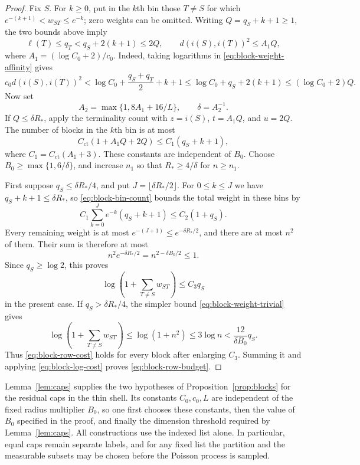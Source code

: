 \begin{proof}
Fix $S$.  For $k\ge0$, put in the $k$th bin those $T\ne S$ for which
$e^{-(k+1)}<w_{ST}\le e^{-k}$; zero weights can be omitted.
Writing $Q=q_S+k+1\ge1$, the two bounds above imply
\begin{equation}\label{eq:block-bin-parameters}
 \ell(T)\le q_T<q_S+2(k+1)\le2Q,
 \qquad
 d(i(S),i(T))^2\le A_1Q,
\end{equation}
where $A_1=(\log C_0+2)/c_0$.
Indeed, taking logarithms in \eqref{eq:block-weight-affinity} gives
\[
 c_0d(i(S),i(T))^2
 <\log C_0+\frac{q_S+q_T}{2}+k+1
 \le\log C_0+q_S+2(k+1)
 \le(\log C_0+2)Q.
\]
Now set
\[
 A_2=\max\{1,8A_1+16/L\},\qquad \delta=A_2^{-1}.
\]
If $Q\le\delta R_*$, apply the terminality count with
$z=i(S)$, $t=A_1Q$, and $u=2Q$.
The number of blocks in the $k$th bin is at most
\begin{equation}\label{eq:block-bin-count}
 C_{\mathrm{ct}}(1+A_1Q+2Q)\le C_1(q_S+k+1),
\end{equation}
where $C_1=C_{\mathrm{ct}}(A_1+3)$.
These constants are independent of $B_0$.
Choose $B_0\ge\max\{1,6/\delta\}$, and increase $n_1$ so that
$R_*\ge4/\delta$ for $n\ge n_1$.

First suppose $q_S\le\delta R_*/4$, and put
$J=\lfloor\delta R_*/2\rfloor$.
For $0\le k\le J$ we have
$q_S+k+1\le\delta R_*$, so \eqref{eq:block-bin-count} bounds the
total weight in these bins by
\[
 C_1\sum_{k=0}^J e^{-k}(q_S+k+1)\le C_2(1+q_S).
\]
Every remaining weight is at most
$e^{-(J+1)}\le e^{-\delta R_*/2}$, and there are at most $n^2$ of them.
Their sum is therefore at most
\[
 n^2e^{-\delta R_*/2}=n^{2-\delta B_0/2}\le1.
\]
Since $q_S\ge\log2$, this proves
\begin{equation}\label{eq:block-row-cost}
 \log\left(1+\sum_{T\ne S}w_{ST}\right)\le C_3q_S
\end{equation}
in the present case.
If $q_S>\delta R_*/4$, the simpler bound
\eqref{eq:block-weight-trivial} gives
\[
 \log\left(1+\sum_{T\ne S}w_{ST}\right)
 \le\log(1+n^2)\le3\log n
 <\frac{12}{\delta B_0}q_S.
\]
Thus \eqref{eq:block-row-cost} holds for every block after enlarging $C_3$.
Summing it and applying \eqref{eq:block-log-cost} proves
\eqref{eq:block-row-budget}.
\end{proof}

Lemma~\ref{lem:caps} supplies the two hypotheses of
Proposition~\ref{prop:blocks} for the residual caps in the thin shell.
Its constants $C_0,c_0,L$ are independent of the fixed radius multiplier
$B_0$, so one first chooses these constants, then the value of $B_0$
specified in the proof, and finally the dimension threshold required by
Lemma~\ref{lem:caps}.
All constructions use the indexed list alone.  In particular, equal caps
remain separate labels, and for any fixed list the partition and the
measurable subsets may be chosen before the Poisson process is sampled.
